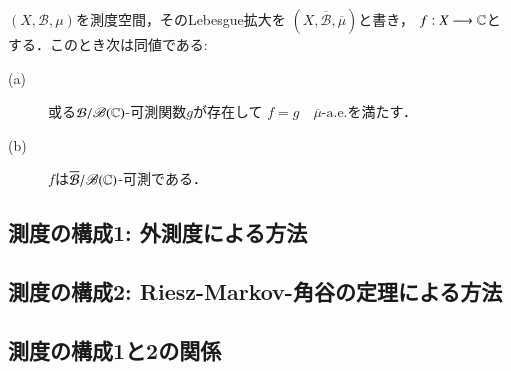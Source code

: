 		\begin{screen}
			\begin{cor}
				$(X,\mathcal{B},\mu)$を測度空間，そのLebesgue拡大を
				$(X,\overline{\mathcal{B}},\overline{\mu})$と書き，
				$f:X \longrightarrow \mathbb{C}$とする．このとき次は同値である:
				\begin{description}
					\item[(a)] 或る$\mathcal{B}/\mathscr{B}(\mathbb{C})$-可測関数$g$が存在して
						$f = g\quad \mbox{$\overline{\mu}$-a.e.}$を満たす．
					\item[(b)] $f$は$\overline{\mathcal{B}}/\mathscr{B}(\mathbb{C})$-可測である．
				\end{description}
			\end{cor}
		\end{screen}
	
	\subsection{測度の構成1: 外測度による方法}
	\subsection{測度の構成2: Riesz-Markov-角谷の定理による方法}
	\subsection{測度の構成1と2の関係}
